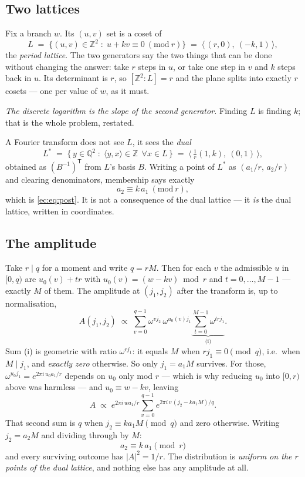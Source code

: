 \documentclass[11pt]{article}
\theoremstyle{plain}
\theoremstyle{remark}
\begin{document}
\subsection{Two lattices}

Fix a branch $w$. Its $(u,v)$ set is a coset of
\[
L \;=\; \{(u,v)\in\mathbb{Z}^2 \;:\; u+kv\equiv 0 \ (\mathrm{mod}\ r)\}
\;=\; \big\langle\, (r,0),\ (-k,1) \,\big\rangle ,
\]
the \emph{period lattice}. The two generators say the two things that can be done without changing
the answer: take $r$ steps in $u$, or take one step in $v$ and $k$ steps back in $u$. Its
determinant is $r$, so $[\mathbb{Z}^2 : L]=r$ and the plane splits into exactly $r$ cosets --- one
per value of $w$, as it must.

\emph{The discrete logarithm is the slope of the second generator.} Finding $L$ is finding $k$;
that is the whole problem, restated.

A Fourier transform does not see $L$, it sees the \emph{dual}
\[
L^{*} \;=\; \{\,y\in\mathbb{Q}^2 \;:\; \langle y,x\rangle\in\mathbb{Z}\ \ \forall x\in L\,\}
\;=\; \big\langle\, \tfrac1r(1,k),\ (0,1) \,\big\rangle ,
\]
obtained as $(B^{-1})^{\mathsf T}$ from $L$'s basis $B$. Writing a point of $L^{*}$ as
$(a_1/r,\,a_2/r)$ and clearing denominators, membership says exactly
\[
a_2 \equiv k\,a_1 \ (\mathrm{mod}\ r) ,
\]
which is \eqref{ec:eq:post}. It is not a consequence of the dual lattice --- it \emph{is} the dual
lattice, written in coordinates.

\subsection{The amplitude}

Take $r\mid q$ for a moment and write $q=rM$. Then for each $v$ the admissible $u$ in $[0,q)$ are
$u_0(v)+tr$ with $u_0(v)=(w-kv)\bmod r$ and $t=0,\dots,M-1$ --- exactly $M$ of them. The amplitude
at $(j_1,j_2)$ after the transform is, up to normalisation,
\[
A(j_1,j_2)\;\propto\;\sum_{v=0}^{q-1}\omega^{v j_2}\,\omega^{u_0(v)j_1}
\underbrace{\sum_{t=0}^{M-1}\omega^{t r j_1}}_{\text{(i)}} .
\]
Sum (i) is geometric with ratio $\omega^{rj_1}$: it equals $M$ when $rj_1\equiv 0 \pmod q$, i.e.\
when $M \mid j_1$, and \emph{exactly zero} otherwise. So only $j_1=a_1M$ survives. For those,
$\omega^{u_0 j_1}=e^{2\pi i\,u_0 a_1/r}$ depends on $u_0$ only mod $r$ --- which is why reducing
$u_0$ into $[0,r)$ above was harmless --- and $u_0\equiv w-kv$, leaving
\[
A \;\propto\; e^{2\pi i\,w a_1/r}\sum_{v=0}^{q-1} e^{2\pi i\,v\,(j_2-k a_1 M)/q} .
\]
That second sum is $q$ when $j_2\equiv ka_1M \pmod q$ and zero otherwise. Writing $j_2=a_2M$ and
dividing through by $M$:
\[
\boxed{\;a_2\equiv k\,a_1 \pmod r\;}
\]
and every surviving outcome has $|A|^2=1/r$. The distribution is \emph{uniform on the $r$ points of
the dual lattice}, and nothing else has any amplitude at all.
\end{document}
